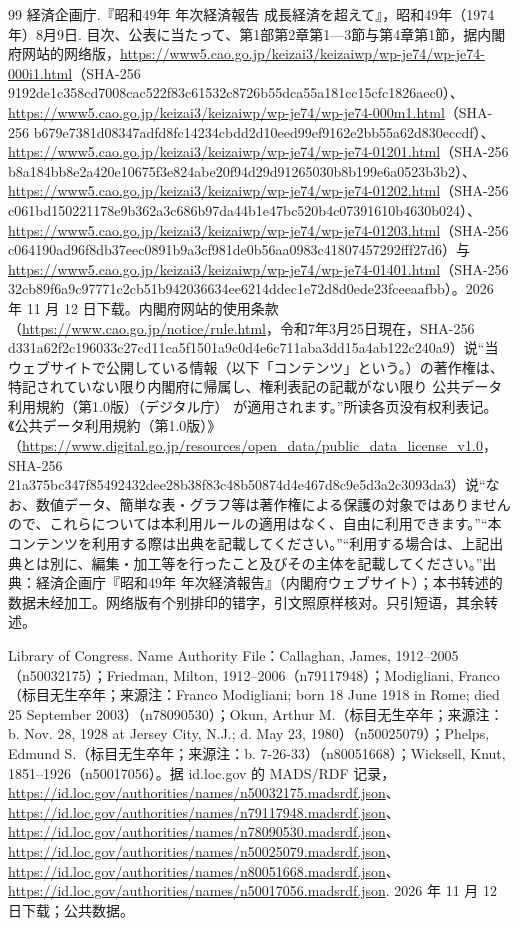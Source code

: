 \begin{thebibliography}{99}
 経済企画庁.『昭和49年 年次経済報告 成長経済を超えて』，昭和49年（1974 年）8月9日. 目次、公表に当たって、第1部第2章第1—3節与第4章第1節，据内閣府网站的网络版，\url{https://www5.cao.go.jp/keizai3/keizaiwp/wp-je74/wp-je74-000i1.html}（SHA-256 9192de1c358cd7008cac522f83c61532c8726b55dca55a181cc15cfc1826aec0）、\url{https://www5.cao.go.jp/keizai3/keizaiwp/wp-je74/wp-je74-000m1.html}（SHA-256 b679e7381d08347adfd8fc14234cbdd2d10eed99ef9162e2bb55a62d830eccdf）、\url{https://www5.cao.go.jp/keizai3/keizaiwp/wp-je74/wp-je74-01201.html}（SHA-256 b8a184bb8e2a420e10675f3e824abe20f94d29d91265030b8b199e6a0523b3b2）、\url{https://www5.cao.go.jp/keizai3/keizaiwp/wp-je74/wp-je74-01202.html}（SHA-256 c061bd150221178e9b362a3c686b97da44b1e47bc520b4c07391610b4630b024）、\url{https://www5.cao.go.jp/keizai3/keizaiwp/wp-je74/wp-je74-01203.html}（SHA-256 c064190ad96f8db37eec0891b9a3cf981de0b56aa0983c41807457292fff27d6）与 \url{https://www5.cao.go.jp/keizai3/keizaiwp/wp-je74/wp-je74-01401.html}（SHA-256 32cb89f6a9c97771c2cb51b942036634ee6214ddec1e72d8d0ede23fceeaafbb）。2026 年 11 月 12 日下载。内閣府网站的使用条款（\url{https://www.cao.go.jp/notice/rule.html}，令和7年3月25日現在，SHA-256 d331a62f2c196033c27cd11ca5f1501a9c0d4e6c711aba3dd15a4ab122c240a9）说“当ウェブサイトで公開している情報（以下「コンテンツ」という。）の著作権は、特記されていない限り内閣府に帰属し、権利表記の記載がない限り 公共データ利用規約（第1.0版）（デジタル庁） が適用されます。”所读各页没有权利表记。《公共データ利用規約（第1.0版）》（\url{https://www.digital.go.jp/resources/open_data/public_data_license_v1.0}，SHA-256 21a375bc347f85492432dee28b38f83c48b50874d4e467d8c9e5d3a2c3093da3）说“なお、数値データ、簡単な表・グラフ等は著作権による保護の対象ではありませんので、これらについては本利用ルールの適用はなく、自由に利用できます。”“本コンテンツを利用する際は出典を記載してください。”“利用する場合は、上記出典とは別に、編集・加工等を行ったこと及びその主体を記載してください。”出典：経済企画庁『昭和49年 年次経済報告』（内閣府ウェブサイト）；本书转述的数据未经加工。网络版有个别排印的错字，引文照原样核对。只引短语，其余转述。

 Library of Congress. Name Authority File：Callaghan, James, 1912--2005（n50032175）；Friedman, Milton, 1912--2006（n79117948）；Modigliani, Franco（标目无生卒年；来源注：Franco Modigliani; born 18 June 1918 in Rome; died 25 September 2003）（n78090530）；Okun, Arthur M.（标目无生卒年；来源注：b. Nov. 28, 1928 at Jersey City, N.J.; d. May 23, 1980）（n50025079）；Phelps, Edmund S.（标目无生卒年；来源注：b. 7-26-33）（n80051668）；Wicksell, Knut, 1851--1926（n50017056）。据 id.loc.gov 的 MADS/RDF 记录，\url{https://id.loc.gov/authorities/names/n50032175.madsrdf.json}、\url{https://id.loc.gov/authorities/names/n79117948.madsrdf.json}、\url{https://id.loc.gov/authorities/names/n78090530.madsrdf.json}、\url{https://id.loc.gov/authorities/names/n50025079.madsrdf.json}、\url{https://id.loc.gov/authorities/names/n80051668.madsrdf.json}、\url{https://id.loc.gov/authorities/names/n50017056.madsrdf.json}. 2026 年 11 月 12 日下载；公共数据。


\end{thebibliography}

